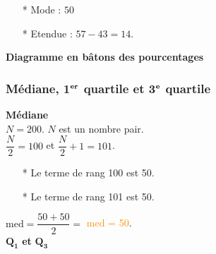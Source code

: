 \begin{itemize}
\item[*] Mode : $50$
\item[*] Etendue : $57 - 43 = 14$.
\end{itemize}

\medskip 

\begin{center}
\textbf{Diagramme en bâtons des pourcentages}

\end{center}

\newpage 

\subsubsection{Médiane, 1$^{\mathrm {\bf er}}$ quartile et 3$^{\mathrm{\bf e}}$ quartile}

\textbf{Médiane} \\

$ N = 200 $. $N$ est un nombre pair. \\

$\dfrac{N}{2} = 100 $ et $\dfrac{N}{2} + 1 = 101 $. \\

\begin{itemize}
\item[*] Le terme de rang 100 est 50.
\item[*] Le terme de rang 101 est 50.
\end{itemize}

\vspace*{.3cm}

$\mathrm{med} = \dfrac{50 + 50}{2} = $ 
      \textcolor {DarkOrange}{\Ovalbox {\textcolor{black}{50}} med = 50}. \\

$\mathbf{Q_1}$ \textbf{et} $\mathbf{Q_3}$ \\

